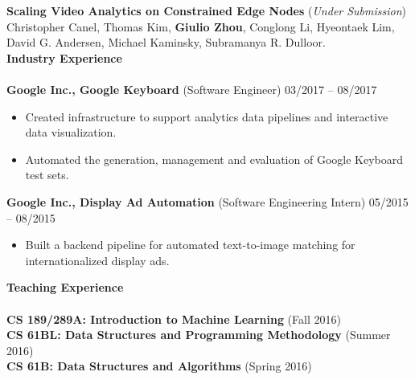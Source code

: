 \documentclass{article}
\begin{document}
\noindent
\textbf{Scaling Video Analytics on Constrained Edge Nodes} (\textit{Under Submission}) \\
Christopher Canel, Thomas Kim, \textbf{Giulio Zhou}, Conglong Li, Hyeontaek Lim, David G. Andersen, Michael Kaminsky, Subramanya R. Dulloor. \\

\noindent
\textbf{{\Large Industry Experience}}\\[-2mm]
\HRule\\
\textbf{Google Inc., Google Keyboard} (Software Engineer)
\hfill 03/2017 -- 08/2017\\
\begin{itemize}
\vspace{-6.5mm}
\item Created infrastructure to support analytics data pipelines and interactive data visualization.
\vspace{-2.5mm}
\item Automated the generation, management and evaluation of Google Keyboard test sets.
\end{itemize}
\vspace{-2mm}

\noindent
\textbf{Google Inc., Display Ad Automation} (Software Engineering Intern)
\hfill 05/2015 -- 08/2015\\
\begin{itemize}
\vspace{-6.5mm}
\item Built a backend pipeline for automated text-to-image matching for internationalized display ads.
\end{itemize}
\vspace{1mm}

\noindent
\textbf{{\Large Teaching Experience}}\\[-2mm]
\HRule\\
\hspace*{1.2mm}\textbf{CS 189/289A: Introduction to Machine Learning} (Fall 2016) \\
\vspace{0.5mm}
\textbf{CS 61BL: Data Structures and Programming Methodology} (Summer 2016) \\
\vspace{0.5mm}
\textbf{CS 61B: Data Structures and Algorithms} (Spring 2016)
\vspace{2.0mm}
\end{document}
